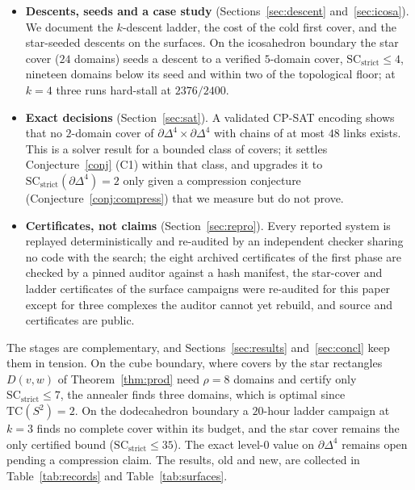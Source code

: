 \documentclass[12pt]{article}
\newcommand{\TC}{\mathrm{TC}}
\newcommand{\SC}{\mathrm{SC}}
\newcommand{\SCst}{\SC_{\mathrm{strict}}}
\begin{document}
\begin{itemize}
\begin{gather*}
\end{gather*}
sharp at subdivision level $0$ (Corollary~\ref{cor:spheres}).  A
counting lemma (Lemma~\ref{lem:rows}) brackets $\rho$ and computes it
outright on several complexes, and we tabulate $\rho$ with its bounds for
the complexes of our campaigns (Table~\ref{tab:rho}).  Presented as a method, the star cover
is the canonical first move and a seed (Section~\ref{sec:starmethod}).
\item \textbf{Descents, seeds and a case study}
(Sections~\ref{sec:descent} and~\ref{sec:icosa}).  We document the
$k$-descent ladder, the cost of the cold first cover, and the star-seeded
descents on the surfaces.  On the icosahedron boundary the star cover
($24$ domains) seeds a descent to a verified $5$-domain cover,
$\SCst\le4$, nineteen domains below its seed and within two of the
topological floor; at $k=4$ three runs hard-stall at $2376/2400$.
\item \textbf{Exact decisions} (Section~\ref{sec:sat}).  A validated
CP-SAT encoding shows that no $2$-domain cover of
$\partial\Delta^4\times\partial\Delta^4$ with chains of at most $48$
links exists.  This is a solver result for a bounded class of covers; it
settles Conjecture~\ref{conj} (C1) within that class, and upgrades it
to $\SCst(\partial\Delta^4)=2$ only given a compression conjecture
(Conjecture~\ref{conj:compress}) that we measure but do not prove.
\item \textbf{Certificates, not claims} (Section~\ref{sec:repro}).
Every reported system is replayed deterministically and re-audited by
an independent checker sharing no code with the search; the eight
archived certificates of the first phase are checked by a pinned
auditor against a hash manifest, the star-cover and ladder certificates
of the surface campaigns were re-audited for this paper except for three
complexes the auditor cannot yet rebuild, and source and certificates
are public.
\end{itemize}

The stages are complementary, and
Sections~\ref{sec:results} and~\ref{sec:concl} keep them in tension.  On
the cube boundary, where covers by the star rectangles $D(v,w)$ of
Theorem~\ref{thm:prod} need $\rho=8$ domains and certify only
$\SCst\le7$, the annealer finds three domains, which is optimal since
$\TC(S^2)=2$.  On the dodecahedron boundary a $20$-hour ladder campaign
at $k=3$ finds no complete cover within its budget, and the star cover
remains the only certified bound ($\SCst\le35$).  The exact level-$0$
value on $\partial\Delta^4$ remains open pending a compression claim.
The results, old and new, are collected in Table~\ref{tab:records}
and Table~\ref{tab:surfaces}.
\end{document}
